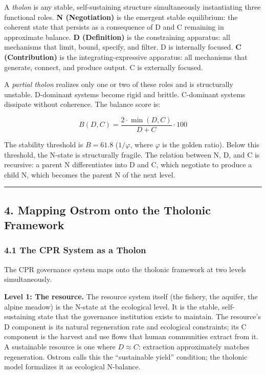\documentclass[
  11pt,
  letterpaper,
]{article}
\begin{document}
A \emph{tholon} is any stable, self-sustaining structure simultaneously
instantiating three functional roles. \textbf{N (Negotiation)} is the
emergent stable equilibrium: the coherent state that persists as a
consequence of D and C remaining in approximate balance. \textbf{D
(Definition)} is the constraining apparatus: all mechanisms that limit,
bound, specify, and filter. D is internally focused. \textbf{C
(Contribution)} is the integrating-expressive apparatus: all mechanisms
that generate, connect, and produce output. C is externally focused.

A \emph{partial tholon} realizes only one or two of these roles and is
structurally unstable. D-dominant systems become rigid and brittle.
C-dominant systems dissipate without coherence. The balance score is:

\[B(D,C) = \frac{2 \cdot \min(D,C)}{D + C} \cdot 100\]

The stability threshold is \(B = 61.8\) (\(1/\varphi\), where
\(\varphi\) is the golden ratio). Below this threshold, the N-state is
structurally fragile. The relation between N, D, and C is recursive: a
parent N differentiates into D and C, which negotiate to produce a child
N, which becomes the parent N of the next level.

\begin{center}\rule{0.5\linewidth}{0.5pt}\end{center}

\subsection{4. Mapping Ostrom onto the Tholonic
Framework}\label{mapping-ostrom-onto-the-tholonic-framework}

\subsubsection{4.1 The CPR System as a
Tholon}\label{the-cpr-system-as-a-tholon}

The CPR governance system maps onto the tholonic framework at two levels
simultaneously.

\textbf{Level 1: The resource.} The resource system itself (the fishery,
the aquifer, the alpine meadow) is the N-state at the ecological level.
It is the stable, self-sustaining state that the governance institution
exists to maintain. The resource's D component is its natural
regeneration rate and ecological constraints; its C component is the
harvest and use flows that human communities extract from it. A
sustainable resource is one where \(D \approx C\): extraction
approximately matches regeneration. Ostrom calls this the ``sustainable
yield'' condition; the tholonic model formalizes it as ecological
N-balance.
\end{document}
